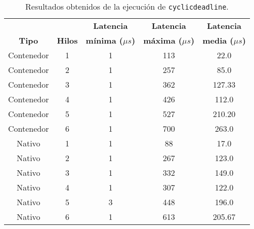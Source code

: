\begin{table}
    \centering
    \begin{tabular}{ | c | c | c | c | c | }
        \hline
                      &                & \textbf{Latencia}         & \textbf{Latencia}         & \textbf{Latencia}        \\
        \textbf{Tipo} & \textbf{Hilos} & \textbf{mínima ($\mu s$)} & \textbf{máxima ($\mu s$)} & \textbf{media ($\mu s$)} \\
        \hline
        Contenedor    & 1              & 1                         & 113                       & 22.0                     \\
        \hline
        Contenedor    & 2              & 1                         & 257                       & 85.0                     \\
        \hline
        Contenedor    & 3              & 1                         & 362                       & 127.33                   \\
        \hline
        Contenedor    & 4              & 1                         & 426                       & 112.0                    \\
        \hline
        Contenedor    & 5              & 1                         & 527                       & 210.20                   \\
        \hline
        Contenedor    & 6              & 1                         & 700                       & 263.0                    \\
        \hline
        Nativo        & 1              & 1                         & 88                        & 17.0                     \\
        \hline
        Nativo        & 2              & 1                         & 267                       & 123.0                    \\
        \hline
        Nativo        & 3              & 1                         & 332                       & 149.0                    \\
        \hline
        Nativo        & 4              & 1                         & 307                       & 122.0                    \\
        \hline
        Nativo        & 5              & 3                         & 448                       & 196.0                    \\
        \hline
        Nativo        & 6              & 1                         & 613                       & 205.67                   \\
        \hline
    \end{tabular}
    \caption{Resultados obtenidos de la ejecución de \texttt{cyclicdeadline}.}
    \label{tab:03-cyclicdeadline_latency}
\end{table}

